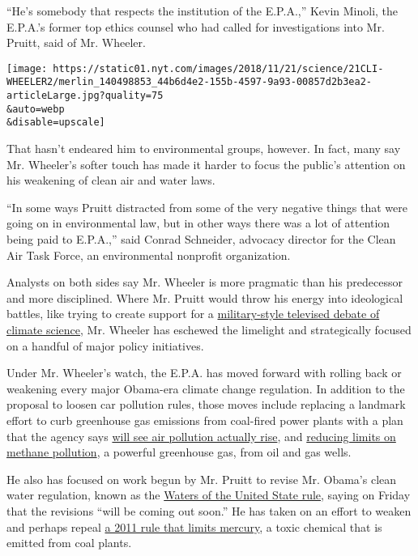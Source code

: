 ``He's somebody that respects the institution of the E.P.A.,'' Kevin
Minoli, the E.P.A.'s former top ethics counsel who had called for
investigations into Mr. Pruitt, said of Mr. Wheeler.

\texttt{[image: https://static01.nyt.com/images/2018/11/21/science/21CLI-WHEELER2/merlin\_140498853\_44b6d4e2-155b-4597-9a93-00857d2b3ea2-articleLarge.jpg?quality=75\\\&auto=webp\\\&disable=upscale]}

That hasn't endeared him to environmental groups, however. In fact, many
say Mr. Wheeler's softer touch has made it harder to focus the public's
attention on his weakening of clean air and water laws.

``In some ways Pruitt distracted from some of the very negative things
that were going on in environmental law, but in other ways there was a
lot of attention being paid to E.P.A.,'' said Conrad Schneider, advocacy
director for the Clean Air Task Force, an environmental nonprofit
organization.

Analysts on both sides say Mr. Wheeler is more pragmatic than his
predecessor and more disciplined. Where Mr. Pruitt would throw his
energy into ideological battles, like trying to create support for a
\href{https://www.nytimes.com/2018/03/09/climate/pruitt-red-team-climate-debate-kelly.html}{military-style
televised debate of climate science}, Mr. Wheeler has eschewed the
limelight and strategically focused on a handful of major policy
initiatives.

Under Mr. Wheeler's watch, the E.P.A. has moved forward with rolling
back or weakening every major Obama-era climate change regulation. In
addition to the proposal to loosen car pollution rules, those moves
include replacing a landmark effort to curb greenhouse gas emissions
from coal-fired power plants with a plan that the agency says
\href{https://www.nytimes.com/2018/08/21/climate/epa-coal-pollution-deaths.html}{will
see air pollution actually rise}, and
\href{https://www.nytimes.com/2018/09/10/climate/methane-emissions-epa.html}{reducing
limits on methane pollution}, a powerful greenhouse gas, from oil and
gas wells.

He also has focused on work begun by Mr. Pruitt to revise Mr. Obama's
clean water regulation, known as the
\href{https://www.nytimes.com/2018/06/14/climate/pruitt-clean-air-water-rollbacks.html}{Waters
of the United State rule}, saying on Friday that the revisions ``will be
coming out soon.'' He has taken on an effort to weaken and perhaps
repeal
\href{https://www.nytimes.com/2018/09/30/climate/epa-trump-mercury-rule.html}{a
2011 rule that limits mercury}, a toxic chemical that is emitted from
coal plants.

